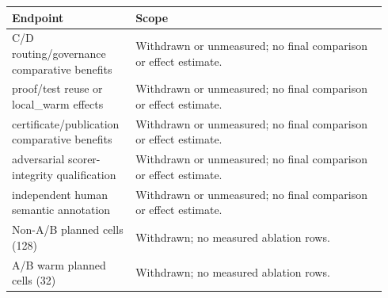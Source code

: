 \begin{tabular}{p{0.30\linewidth}p{0.64\linewidth}}
\hline
Endpoint & Scope \\
\hline
C/D routing/governance comparative benefits & Withdrawn or unmeasured; no final comparison or effect estimate. \\
proof/test reuse or local\_warm effects & Withdrawn or unmeasured; no final comparison or effect estimate. \\
certificate/publication comparative benefits & Withdrawn or unmeasured; no final comparison or effect estimate. \\
adversarial scorer-integrity qualification & Withdrawn or unmeasured; no final comparison or effect estimate. \\
independent human semantic annotation & Withdrawn or unmeasured; no final comparison or effect estimate. \\
Non-A/B planned cells (128) & Withdrawn; no measured ablation rows. \\
A/B warm planned cells (32) & Withdrawn; no measured ablation rows. \\
\hline
\end{tabular}
